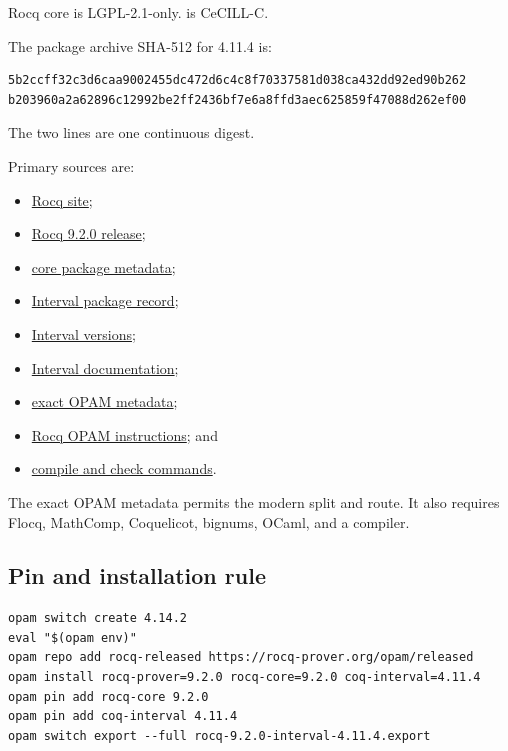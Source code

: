 \documentclass[11pt]{article}
\begin{document}
Rocq core is LGPL-2.1-only.   is CeCILL-C.

The package archive SHA-512 for  4.11.4 is:

\begin{lstlisting}
5b2ccff32c3d6caa9002455dc472d6c4c8f70337581d038ca432dd92ed90b262
b203960a2a62896c12992be2ff2436bf7e6a8ffd3aec625859f47088d262ef00
\end{lstlisting}

The two lines are one continuous digest.

Primary sources are:
\begin{itemize}[leftmargin=*]
  \item \href{https://rocq-prover.org/}{Rocq site};
  \item \href{https://github.com/rocq-prover/rocq/releases/tag/V9.2.0}
  {Rocq 9.2.0 release};
  \item \href{https://raw.githubusercontent.com/rocq-prover/rocq/V9.2.0/rocq-core.opam}
  {core package metadata};
  \item \href{https://rocq-prover.org/p/coq-interval/4.11.4}{Interval package record};
  \item \href{https://rocq-prover.org/p/coq-interval/latest/versions}{Interval versions};
  \item \href{https://coqinterval.gitlabpages.inria.fr/}{Interval documentation};
  \item
  \href{https://raw.githubusercontent.com/coq/opam-coq-archive/master/released/packages/coq-interval/coq-interval.4.11.4/opam}
  {exact OPAM metadata};
  \item \href{https://rocq-prover.org/docs/using-opam}{Rocq OPAM instructions}; and
  \item
  \href{https://docs.rocq-prover.org/master/refman/practical-tools/coq-commands.html}
  {compile and check commands}.
\end{itemize}

The exact OPAM metadata permits the modern split  and  route.  It
also requires Flocq, MathComp, Coquelicot, bignums, OCaml, and a compiler.

\subsection{Pin and installation rule}

\begin{lstlisting}
opam switch create 4.14.2
eval "$(opam env)"
opam repo add rocq-released https://rocq-prover.org/opam/released
opam install rocq-prover=9.2.0 rocq-core=9.2.0 coq-interval=4.11.4
opam pin add rocq-core 9.2.0
opam pin add coq-interval 4.11.4
opam switch export --full rocq-9.2.0-interval-4.11.4.export
\end{lstlisting}
\end{document}
